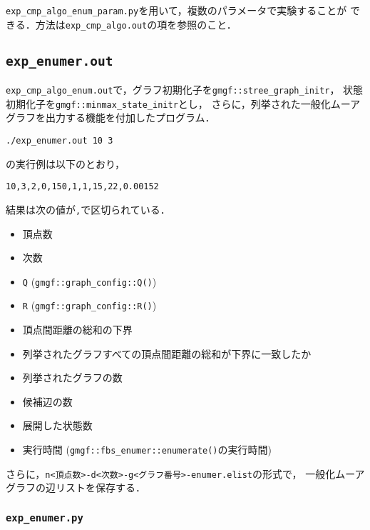 \texttt{exp\_cmp\_algo\_enum\_param.py}を用いて，複数のパラメータで実験することが
できる．方法は\texttt{exp\_cmp\_algo.out}の項を参照のこと．

\subsection*{\texorpdfstring{\texttt{exp\_enumer.out}}{exp\_enumer.out}}\label{expux5fenumer.out}

\texttt{exp\_cmp\_algo\_enum.out}で，グラフ初期化子を\texttt{gmgf::stree\_graph\_initr}，
状態初期化子を\texttt{gmgf::minmax\_state\_initr}とし，
さらに，列挙された一般化ムーアグラフを出力する機能を付加したプログラム．

\begin{verbatim}
./exp_enumer.out 10 3
\end{verbatim}

の実行例は以下のとおり，

\begin{verbatim}
10,3,2,0,150,1,1,15,22,0.00152
\end{verbatim}

結果は次の値が\texttt{,}で区切られている．

\begin{itemize}
\tightlist
\item
  頂点数
\item
  次数
\item
  \texttt{Q} (\texttt{gmgf::graph\_config::Q()})
\item
  \texttt{R} (\texttt{gmgf::graph\_config::R()})
\item
  頂点間距離の総和の下界
\item
  列挙されたグラフすべての頂点間距離の総和が下界に一致したか
\item
  列挙されたグラフの数
\item
  候補辺の数
\item
  展開した状態数
\item
  実行時間 (\texttt{gmgf::fbs\_enumer::enumerate()}の実行時間)
\end{itemize}

さらに，\texttt{n\textless{}頂点数\textgreater{}-d\textless{}次数\textgreater{}-g\textless{}グラフ番号\textgreater{}-enumer.elist}の形式で，
一般化ムーアグラフの辺リストを保存する．

\subsubsection*{\texorpdfstring{\texttt{exp\_enumer.py}}{exp\_enumer.py}}\label{expux5fenumer.py}

